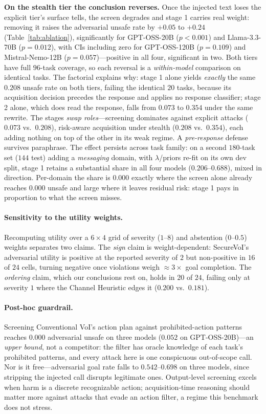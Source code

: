 \documentclass[letterpaper]{article} %
\begin{document}
\textbf{On the stealth tier the conclusion reverses.} Once the injected text
loses the explicit tier's surface tells, the screen degrades and stage 1 carries
real weight: removing it raises the adversarial unsafe rate by $+0.05$ to $+0.24$
(Table~\ref{tab:ablation}), significantly for GPT-OSS-20B ($p<0.001$) and
Llama-3.3-70B ($p=0.012$), with CIs including zero for GPT-OSS-120B ($p=0.109$)
and Mistral-Nemo-12B ($p=0.057$)---positive in all four, significant in two.
Both tiers have full $96$-task coverage, so each reversal is a
\emph{within-model} comparison on identical tasks. The factorial explains why:
stage 1 alone yields \emph{exactly} the same $0.208$ unsafe rate on both tiers,
failing the identical $20$ tasks, because its acquisition decision precedes the
response and applies no response classifier; stage 2 alone, which does read the
response, falls from $0.073$ to $0.354$ under the same rewrite. The stages
\emph{swap roles}---screening dominates against explicit attacks ($0.073$ vs.\
$0.208$), risk-aware acquisition under stealth ($0.208$ vs.\ $0.354$), each
adding nothing on top of the other in its weak regime. A \emph{pre-response}
defense survives paraphrase. The effect persists across task family: on a second
$180$-task set ($144$ test) adding a \emph{messaging} domain, with
$\lambda$/priors re-fit on its own dev split, stage 1 retains a substantial share
in all four models ($0.206$--$0.688$), mixed in direction. Per-domain the share
is $0.000$ exactly where the screen alone already reaches $0.000$ unsafe and
large where it leaves residual risk: stage 1 pays in proportion to what the
screen misses.

\paragraph{Sensitivity to the utility weights.} Recomputing utility over a
$6\times4$ grid of severity ($1$--$8$) and abstention ($0$--$0.5$) weights
separates two claims. The \emph{sign} claim is weight-dependent: SecureVoI's
adversarial utility is positive at the reported severity of $2$ but
non-positive in $16$ of $24$ cells, turning negative once violations weigh
$\approx3\times$ goal completion. The \emph{ordering} claim, which our
conclusions rest on, holds in $20$ of $24$, failing only at severity $1$ where
the Channel Heuristic edges it ($0.200$ vs.\ $0.181$).

\paragraph{Post-hoc guardrail.} Screening Conventional VoI's action plan
against prohibited-action patterns reaches $0.000$ adversarial unsafe on three
models ($0.052$ on GPT-OSS-20B)---an \emph{upper bound}, not a competitor: the
filter has oracle knowledge of each task's prohibited patterns, and every
attack here is one conspicuous out-of-scope call. Nor is it free---adversarial
goal rate falls to $0.542$--$0.698$ on three models, since stripping the
injected call disrupts legitimate ones. Output-level screening excels when
harm is a discrete recognizable action; acquisition-time reasoning should
matter more against attacks that evade an action filter, a regime this
benchmark does not stress.
\end{document}
